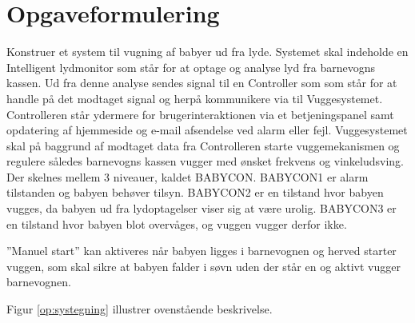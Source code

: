 \chapter{Opgaveformulering}

Konstruer et system til vugning af babyer ud fra lyde. Systemet skal indeholde en Intelligent lydmonitor som står for at optage og analyse lyd fra barnevogns kassen. Ud fra denne analyse sendes signal til en Controller som som står for at handle på det modtaget signal og herpå kommunikere via \iic til Vuggesystemet. Controlleren står ydermere for brugerinteraktionen via et betjeningspanel samt opdatering af hjemmeside og e-mail afsendelse ved alarm eller fejl. Vuggesystemet skal på baggrund af modtaget data fra Controlleren starte vuggemekanismen og regulere således barnevogns kassen vugger med ønsket frekvens og vinkeludsving. Der skelnes mellem 3 niveauer, kaldet BABYCON. BABYCON1 er alarm tilstanden og babyen behøver tilsyn. BABYCON2 er en tilstand hvor babyen vugges, da babyen ud fra lydoptagelser viser sig at være urolig. BABYCON3 er en tilstand hvor babyen blot overvåges, og vuggen vugger derfor ikke. 

''Manuel start'' kan aktiveres når babyen ligges i barnevognen og herved starter vuggen, som skal sikre at babyen falder i søvn uden der står en og aktivt vugger barnevognen. 

Figur \ref{op:systegning} illustrer ovenstående beskrivelse. 

